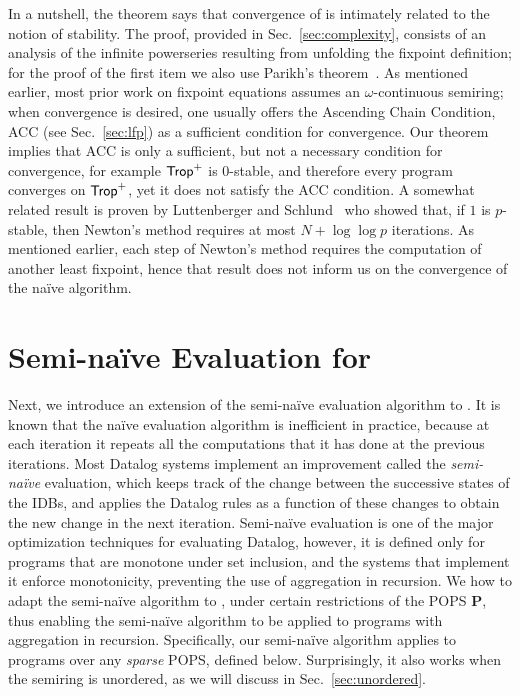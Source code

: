 In a nutshell, the theorem says that convergence of \datalogo is
intimately related to the notion of stability.  The proof, provided in
Sec.~\ref{sec:complexity}, consists of an analysis of the infinite
powerseries resulting from unfolding the fixpoint definition; for
the proof of the first item we also use Parikh's
theorem~\cite{MR209093}.  As mentioned earlier, most prior work on
fixpoint equations assumes an $\omega$-continuous semiring; when
convergence is desired, one usually offers the Ascending Chain
Condition, ACC (see Sec.~\ref{sec:lfp}) as a sufficient condition for
convergence.  Our theorem implies that ACC is only a sufficient, but
not a necessary condition for convergence, for example $\text{\sf Trop}^+$ is
$0$-stable, and therefore every \datalogo program converges on
$\text{\sf Trop}^+$, yet it does not satisfy the ACC condition.  A somewhat
related result is proven by Luttenberger and
Schlund~\cite{DBLP:journals/iandc/LuttenbergerS16} who showed that, if
$1$ is $p$-stable, then Newton's method requires at most
$N + \log\log p$ iterations.  As mentioned earlier, each step of
Newton's method requires the computation of another least fixpoint,
hence that result does not inform us on the convergence of the na\"ive
algorithm.

\section{Semi-na\"ive Evaluation for \datalogo}
\label{sec:semi-naive}

Next, we introduce an extension of the semi-na\"ive evaluation
algorithm to \datalogo.  It is known that the na\"ive evaluation
algorithm is inefficient in practice, because at each iteration it
repeats all the computations that it has done at the previous
iterations.  Most Datalog systems implement an improvement called the
{\em semi-na\"ive} evaluation, which keeps track of the change between
the successive states of the IDBs, and applies the Datalog rules as a
function of these changes to obtain the new change in the next iteration.
Semi-na\"ive evaluation is one of the major optimization techniques
for evaluating Datalog, however, it is defined only for programs that
are monotone under set inclusion, and the systems that implement it
enforce monotonicity, preventing the use of aggregation in
recursion. We how to adapt the
semi-na\"ive algorithm to \datalogo, under certain restrictions of the
POPS $\bm P$, thus enabling the semi-na\"ive algorithm to be applied
to programs with aggregation in recursion.
Specifically, our semi-na\"ive algorithm applies to \datalogo programs
 over any {\em sparse} POPS, defined below.
Surprisingly, it also works when the semiring is unordered, 
 as we will discuss in Sec.~\ref{sec:unordered}.

